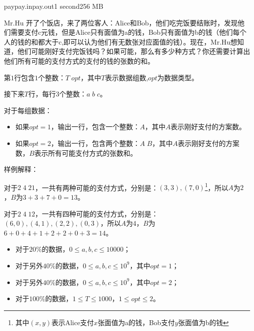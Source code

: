 \documentclass[11pt,a4paper,oneside]{article}
\begin{document}
\begin{problem}{pay}{pay.in}{pay.out}{1 second}{256 MB}

	Mr.Hu 开了个饭店，来了两位客人：Alice和Bob，他们吃完饭要结账时，发现他们需要支付c元钱，但是Alice只有面值为a的钱，Bob只有面值为b的钱（他们每个人的钱的和都大于c,即可以认为他们有无数张对应面值的钱）。现在，Mr.Hu想知道，他们可能刚好支付完饭钱吗？如果可能，那么有多少种方式？你还需要计算出他们所有可能的支付方式的支付的钱的张数的和。

    \InputFile

    第$1$行包含$1$个整数：$T \; opt$，其中$T$表示数据组数,$opt$为数据类型。

	接下来$T$行，每行$3$个整数：$a \; b\; c$。

    \OutputFile
    
    对于每组数据：
    \begin{itemize}
    	\item 如果$opt = 1$，输出一行，包含一个整数：$A$，其中$A$表示刚好支付的方案数。
    	\item 如果$opt = 2$，输出一行，包含两个整数：$A \; B$，其中$A$表示刚好支付的方案数，$B$表示所有可能支付方式的张数和。
    \end{itemize}
    
    \Example

    \begin{example}
    \end{example}
	
	样例解释：
	
	对于$2 \; 4 \; 21$，一共有两种可能的支付方式，分别是：$(3,3), (7,0)$\footnote{其中$(x,y)$表示Alice支付$x$张面值为a的钱，Bob支付$y$张面值为b的钱}，所以$A$为$2$，$B$为$3 + 3 + 7 + 0 = 13$。
	
	对于$2 \; 4 \; 12$，一共有四种可能的支付方式，分别是：$(6,0),(4,1),(2,2),(0,3)$，所以$A$为$4$，$B$为$6 + 0 + 4 + 1 + 2 + 2 + 0 + 3 = 14$。
	
    \Note
    
    \begin{itemize}
		\item 对于$20\%$的数据，$0 \leq a, b, c \leq 10000$；
		\item 对于另外$40\%$的数据，$0 \leq a, b, c \leq 10^9$，其中$opt = 1$；
		\item 对于另外$40\%$的数据，$0 \leq a, b, c \leq 10^9$，其中$opt = 2$；
		\item 对于$100\%$的数据，$1 \leq T \leq 1000$，$1 \leq opt \leq 2$。
    \end{itemize}

\end{problem}
\end{document}
